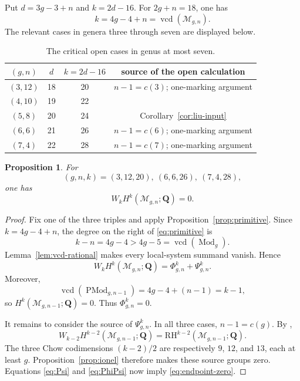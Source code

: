\documentclass[12pt,reqno]{amsart}
\newcommand{\Q}{\mathbf{Q}}
\newcommand{\M}{\mathcal{M}}
\newcommand{\RH}{\mathrm{RH}}
\newcommand{\Mod}{\operatorname{Mod}}
\newcommand{\PMod}{\operatorname{PMod}}
\newcommand{\vcd}{\operatorname{vcd}}
\newtheorem{proposition}[theorem]{Proposition}
\theoremstyle{definition}
\theoremstyle{remark}
\begin{document}
Put $d=3g-3+n$ and $k=2d-16$.  For $2g+n=18$, one has
\begin{equation}\label{eq:critical-arithmetic}
 k=4g-4+n=\vcd(\M_{g,n}).
\end{equation}
The relevant cases in genera three through seven are displayed below.

\begin{table}[ht]
\centering
\caption{The critical open cases in genus at most seven.}
\label{tab:critical}
\small
\begin{tabular}{@{}cccc@{}}
\toprule
$(g,n)$&$d$&$k=2d-16$&source of the open calculation\\
\midrule
$(3,12)$&18&20&$n-1=c(3)$; one-marking argument\\
$(4,10)$&19&22&\cite[Proposition~4.5]{CLP}\\
$(5,8)$ &20&24&Corollary~\ref{cor:liu-input}\\
$(6,6)$ &21&26&$n-1=c(6)$; one-marking argument\\
$(7,4)$ &22&28&$n-1=c(7)$; one-marking argument\\
\bottomrule
\end{tabular}
\end{table}

\begin{proposition}\label{prop:endpoint-vanishing}
For
\[
 (g,n,k)=(3,12,20),\ (6,6,26),\ (7,4,28),
\]
one has
\begin{equation}\label{eq:endpoint-zero}
 W_kH^k(\M_{g,n};\Q)=0.
\end{equation}
\end{proposition}

\begin{proof}
Fix one of the three triples and apply
Proposition~\ref{prop:primitive}.  Since $k=4g-4+n$, the degree on the
right of \eqref{eq:primitive} is
\[
 k-n=4g-4>4g-5=\vcd(\Mod_g).
\]
Lemma~\ref{lem:vcd-rational} makes every local-system summand vanish.
Hence
\begin{equation}\label{eq:PhiPsi}
 W_kH^k(\M_{g,n};\Q)=\Phi^k_{g,n}+\Psi^k_{g,n}.
\end{equation}
Moreover,
\[
 \vcd(\PMod_{g,n-1})=4g-4+(n-1)=k-1,
\]
so $H^k(\M_{g,n-1};\Q)=0$.  Thus $\Phi^k_{g,n}=0$.

It remains to consider the source of $\Psi^k_{g,n}$.  In all three cases,
$n-1=c(g)$.  By \cite[Table~1, Lemma~4.3, and
Proposition~4.5]{CLP},
\[
 W_{k-2}H^{k-2}(\M_{g,n-1};\Q)
 =\RH^{k-2}(\M_{g,n-1};\Q).
\]
The three Chow codimensions $(k-2)/2$ are respectively $9$, $12$, and
$13$, each at least $g$.  Proposition~\ref{prop:ionel} therefore makes
these source groups zero.  Equations \eqref{eq:Psi} and \eqref{eq:PhiPsi}
now imply \eqref{eq:endpoint-zero}.
\end{proof}
\end{document}
